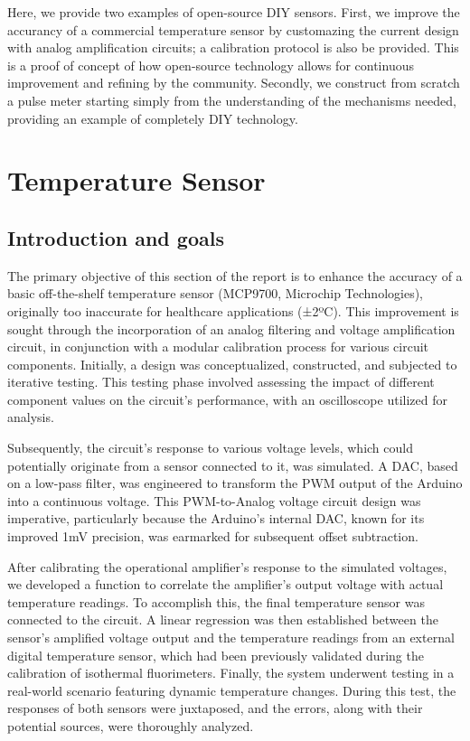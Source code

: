 \documentclass[conference]{IEEEtran}
\begin{document}
Here, we provide two examples of open-source DIY sensors. First, we improve 
the accurancy of a commercial temperature sensor by customazing the current design 
with analog amplification circuits; a calibration protocol is also be provided. 
This is a proof of concept of how open-source technology allows for continuous 
improvement and refining by the community. Secondly, we construct from scratch 
a pulse meter starting simply from the understanding of the mechanisms 
needed, providing an example of completely DIY technology.


\section{Temperature Sensor} %
   \subsection{Introduction and goals}
   The primary objective of this section of the report is to enhance the 
accuracy of a basic off-the-shelf temperature sensor (MCP9700, Microchip Technologies), originally too 
inaccurate for healthcare applications (±2ºC). This improvement is sought 
through the incorporation of an analog filtering and voltage amplification 
circuit, in conjunction with a modular calibration process for various 
circuit components. Initially, a design was conceptualized, constructed, 
and subjected to iterative testing. This testing phase involved assessing 
the impact of different component values on the circuit's performance, 
with an oscilloscope utilized for analysis.

Subsequently, the circuit's response to various voltage levels, which could 
potentially originate from a sensor connected to it, was simulated. A DAC, 
based on a low-pass filter, was engineered to transform the PWM output of 
the Arduino into a continuous voltage. This PWM-to-Analog voltage circuit 
design was imperative, particularly because the Arduino's internal DAC, 
known for its improved 1mV precision, was earmarked for subsequent offset 
subtraction.

After calibrating the operational amplifier's response to the simulated 
voltages, we developed a function to correlate the amplifier's output 
voltage with actual temperature readings. To accomplish this, the final 
temperature sensor was connected to the circuit. A linear regression was 
then established between the sensor's amplified voltage output and the 
temperature readings from an external digital temperature sensor, which had 
been previously validated during the calibration of isothermal fluorimeters. 
Finally, the system underwent testing in a real-world scenario featuring 
dynamic temperature changes. During this test, the responses of both sensors 
were juxtaposed, and the errors, along with their potential sources, were 
thoroughly analyzed.
\end{document}
